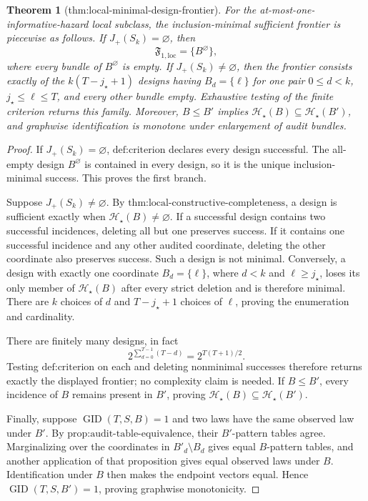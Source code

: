 \documentclass{article}
\newtheorem{theorem}{Theorem}
\begin{document}
\begin{theorem}[thm:local-minimal-design-frontier]\label{thm:local-minimal-design-frontier}
For the at-most-one-informative-hazard local subclass, the inclusion-minimal sufficient frontier is piecewise as follows.  If \(J_+(S_k)=\varnothing\), then
\[
\mathfrak F_{1,\mathrm{loc}}=\{B^\varnothing\},
\]
where every bundle of \(B^\varnothing\) is empty.  If
\(J_+(S_k)\ne\varnothing\), then the frontier consists exactly of the
\(k(T-j_\star+1)\) designs having \(B_d=\{\ell\}\) for one pair
\(0\le d<k\), \(j_\star\le\ell\le T\), and every other bundle empty.  Exhaustive testing of the finite criterion returns this family.  Moreover,
\(B\le B'\) implies \(\mathcal H_\star(B)\subseteq\mathcal H_\star(B')\), and graphwise identification is monotone under enlargement of audit bundles.
\end{theorem}
\begin{proof}
If \(J_+(S_k)=\varnothing\), \(\text{def:criterion}\) declares every design successful.  The all-empty design \(B^\varnothing\) is contained in every design, so it is the unique inclusion-minimal success.  This proves the first branch.

Suppose \(J_+(S_k)\ne\varnothing\).  By
\(\text{thm:local-constructive-completeness}\), a design is sufficient exactly when \(\mathcal H_\star(B)\ne\varnothing\).  If a successful design contains two successful incidences, deleting all but one preserves success.  If it contains one successful incidence and any other audited coordinate, deleting the other coordinate also preserves success.  Such a design is not minimal.  Conversely, a design with exactly one coordinate \(B_d=\{\ell\}\), where \(d<k\) and \(\ell\ge j_\star\), loses its only member of \(\mathcal H_\star(B)\) after every strict deletion and is therefore minimal.  There are \(k\) choices of \(d\) and \(T-j_\star+1\) choices of \(\ell\), proving the enumeration and cardinality.

There are finitely many designs, in fact
\[
2^{\sum_{d=0}^{T-1}(T-d)}=2^{T(T+1)/2}.
\]
Testing \(\text{def:criterion}\) on each and deleting nonminimal successes therefore returns exactly the displayed frontier; no complexity claim is needed.  If \(B\le B'\), every incidence of \(B\) remains present in \(B'\), proving
\(\mathcal H_\star(B)\subseteq\mathcal H_\star(B')\).

Finally, suppose \(\operatorname{GID}(T,S,B)=1\) and two laws have the same observed law under \(B'\).  By \(\text{prop:audit-table-equivalence}\), their \(B'\)-pattern tables agree.  Marginalizing over the coordinates in
\(B'_d\setminus B_d\) gives equal \(B\)-pattern tables, and another application of that proposition gives equal observed laws under \(B\).  Identification under \(B\) then makes the endpoint vectors equal.  Hence
\(\operatorname{GID}(T,S,B')=1\), proving graphwise monotonicity.
\end{proof}
\end{document}
